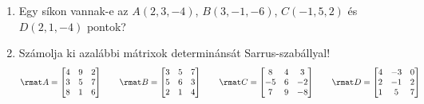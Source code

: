 \documentclass[a4paper, 12pt]{scrartcl}
\begin{document}
\begin{enumerate}
  \item Egy síkon vannak-e az $A(2,3,-4)$, $B(3,-1,-6)$, $C(-1,5,2)$ és
        $D(2,1,-4)$ pontok?

  \item Számolja ki azalábbi mátrixok determinánsát Sarrus-szabállyal!
        $$
          \rmat A =
          \begin{bmatrix}
            4 & 9 & 2 \\
            3 & 5 & 7 \\
            8 & 1 & 6
          \end{bmatrix}
          \qquad
          \rmat B =
          \begin{bmatrix}
            3 & 5 & 7 \\
            5 & 6 & 3 \\
            2 & 1 & 4
          \end{bmatrix}
          \qquad
          \rmat C =
          \begin{bmatrix}
            8  & 4 & 3  \\
            -5 & 6 & -2 \\
            7  & 9 & -8
          \end{bmatrix}
          \qquad
          \rmat D =
          \begin{bmatrix}
            4 & -3 & 0 \\
            2 & -1 & 2 \\
            1 & 5  & 7
          \end{bmatrix}
        $$


\end{enumerate}
\end{document}

